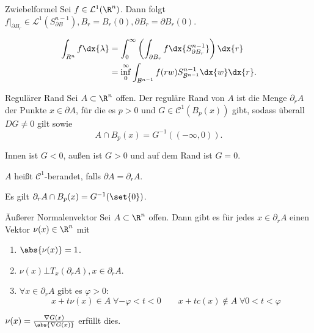 \begin{karte}{Zwiebelformel}
    Sei \( f\in \mathcal{L}^1(\R^n) \). Dann folgt \( f|_{\partial B_r} \in \mathcal{L}^1(S_{\partial B}^{n-1}), 
    B_r = B_r(0), \partial B_r = \partial B_r(0) \).

    \begin{align*}
        \int_{R^n} f \dx{\lambda} &= \int_0^\infty \left( \int_{\partial B_r} f \dx{S_{\partial B_r}^{n-1}} \right) \dx{r} \\
        &= \inf_0^\infty \int_{\mathcal{B}^{n-1}} f(r w) S_{\mathcal{B}^{n-1}}^{n-1} \dx{w} \dx{r}.
    \end{align*} 

\end{karte}

\begin{karte}{Regulärer Rand}
    Sei \(A\subset \R^n\) offen. Der reguläre Rand von \(A\) ist die Menge \( \partial_r A \) 
    der Punkte \(x \in \partial A\), für die es \( p > 0 \) und \( G \in \mathcal{C}^1(B_p(x)) \) gibt, 
    sodass überall \( DG \neq 0 \) gilt sowie 
    \[ A \cap B_{p}(x) = G^{-1}((-\infty,0)). \]

    Innen ist \(G < 0\), außen ist \(G>0\) und auf dem Rand ist \(G = 0\).

    \(A\) heißt \(\mathcal{C}^1\)-berandet, falls \( \partial A = \partial_r A \).

    Es gilt \( \partial_r A \cap B_p (x) = G^{-1}(\set{0}) \).
\end{karte}

\begin{karte}{Äußerer Normalenvektor}
    Sei \( A\subset \R^n \) offen. Dann gibt es für jedes \( x\in \partial_r A \) einen Vektor 
    \( \nu(x) \in \R^n \) mit 
    \begin{enumerate}
        \item \(\abs{\nu(x)} = 1\).
        \item \( \nu(x) \bot T_x(\partial_r A), x \in \partial_r A \).
        \item \( \forall x \in \partial_r A \) gibt es \( \varphi > 0 \):
        \[ x + t\nu(x) \in A \;\forall -\varphi < t < 0 \qquad x + tc(x) \notin A \;\forall 0 < t < \varphi \]
    \end{enumerate}
    \( \nu(x) = \frac{\nabla G(x)}{ \abs{ \nabla G(x) }} \) erfüllt dies.
\end{karte}